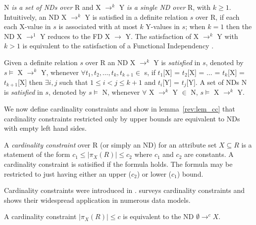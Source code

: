 N {\em is  a set of NDs over } R and X $\to^k$ Y 
{\em is a single ND over } R, with $k \ge 1$.
Intuitively, an ND X $\to^k$ Y is satisfied in a definite relation $s$ over R,
if each each X-value in $s$ is associated with at most $k$ Y-values in $s$;
when $k = 1$ then the ND X $\to^1$ Y reduces to the FD X $\to$ Y. The
satisfaction of X $\to^k$ Y with $k > 1$ is equivalent to the
satisfaction of a Functional Independency \cite{gl90}.


\begin{definition}[Satisfaction of an ND]\label{def:sat-nd}
\begin{rm}
Given a definite relation $s$ over R
an ND X $\to^k$ Y is {\em satisfied} in $s$,
denoted by $s \models$ X $\to^k$ Y, whenever
$\forall t_1, t_2, \ldots, t_k, t_{k+1} \in$ s, if 
$t_1$[X] = $t_2$[X] = $\ldots$ = $t_k$[X] = $t_{k+1}$[X] then 
$\exists i,j$ such that $1 \le i < j \le k+1$
and $t_i$[Y] = $t_j$[Y].
A set of NDs N is {\em satisfied} in $s$,
denoted by $s \models$ N, whenever
$\forall$ X $\to^k$ Y $\in$ N, $s \models$ X $\to^k$ Y.
\end{rm}
\end{definition}

We now define cardinality constraints and show in
lemma~\ref{rev:lem_cc} that cardinality constraints restricted only by
upper bounds are equivalent to NDs with empty left hand sides.

\begin{definition}
\begin{rm}
A {\em cardinality constraint} over R (or simply an ND) for an
attribute set $X \subseteq R$
is a statement of the form $c_1 \le \mid \pi_X(R) \mid \le c_2$ where
$c_1$ and $c_2$ are constants. A cardinality constraint is satisified
if the formula holds. The formula may be restricted to just having
either an upper ($c_2$) or lower ($c_1$) bound.
\end{rm}
\end{definition}
\medskip

Cardinality constraints were introduced in \cite{kan80}. \cite{lew93}
surveys cardinality constraints and shows their widespread application
in numerous data models. 

\begin{lemma}\label{rev:lem_cc}
\begin{rm}
A cardinality constraint $\mid \pi_X(R) \mid \le c$ is equivalent to
the ND $\emptyset \to^c X$.
\end{rm}
\end{lemma}


